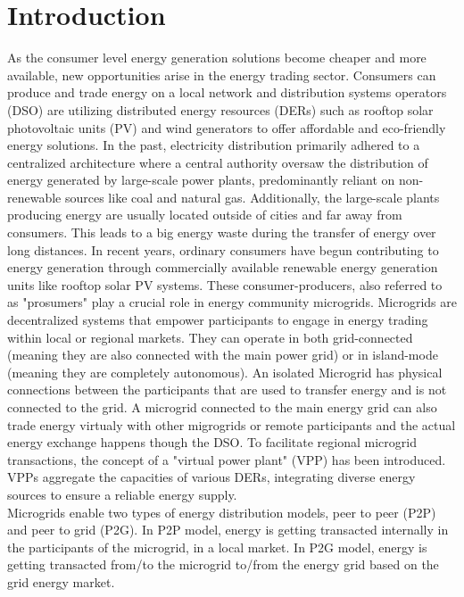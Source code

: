 \chapter{Introduction} \label{introduction}
As the consumer level energy generation solutions become cheaper and more available, new opportunities arise in the energy trading sector. Consumers can produce and trade energy on a 
local network and distribution systems operators (DSO) are utilizing distributed energy resources (DERs) such as rooftop solar photovoltaic units (PV) and wind generators to offer affordable and eco-friendly energy 
solutions.
In the past, electricity distribution primarily adhered to a centralized architecture where a central authority oversaw the distribution of energy generated by 
large-scale power plants, predominantly reliant on non-renewable sources like coal and natural gas. Additionally, the large-scale plants producing energy are usually located outside of
cities and far away from consumers. This leads to a big energy waste during the transfer of energy over long distances.
In recent years, ordinary consumers have begun contributing to energy generation through commercially available renewable energy generation units like rooftop solar PV systems. These consumer-producers, also referred 
to as "prosumers" play a crucial role in energy community microgrids. Microgrids are decentralized systems that empower participants to engage in energy trading within local or regional markets. 
They can operate in both grid-connected (meaning they are also connected with the main power grid) or in island-mode (meaning they are completely 
autonomous). An isolated Microgrid has physical connections between the participants that are used to transfer energy and is not connected to the grid. A microgrid connected to the main 
energy grid can also trade energy virtualy with other migrogrids or remote participants and the actual energy exchange happens though the DSO.
To facilitate regional microgrid transactions, the concept of a "virtual power plant" (VPP) has been introduced. VPPs aggregate the capacities of various DERs, integrating diverse energy 
sources to ensure a reliable energy supply. \cite{Pipattanasomporn2013,cali2019towards,BrooklynMicrogrid}\\
Microgrids enable two types of energy distribution models, peer to peer (P2P) and peer to grid (P2G).
In P2P model, energy is getting transacted internally in the participants of the microgrid, in a local market.
In P2G model, energy is getting transacted from/to the microgrid to/from the energy grid based on the grid energy market.
